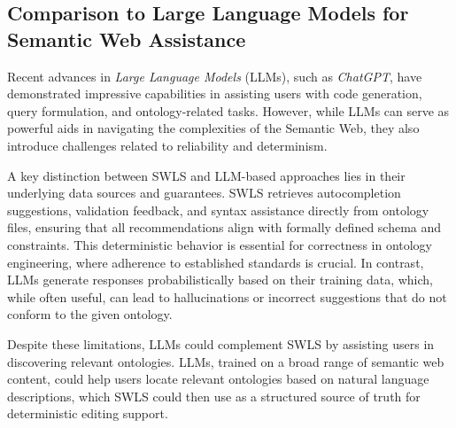 \subsection{Comparison to Large Language Models for Semantic Web Assistance}

Recent advances in \textit{Large Language Models} (LLMs), such as \textit{ChatGPT}, have demonstrated impressive capabilities in assisting users with code generation, query formulation, and ontology-related tasks\cite{Chad}. 
However, while LLMs can serve as powerful aids in navigating the complexities of the Semantic Web, they also introduce challenges related to reliability and determinism.  

A key distinction between SWLS and LLM-based approaches lies in their underlying data sources and guarantees.
SWLS retrieves autocompletion suggestions, validation feedback, and syntax assistance directly from ontology files, ensuring that all recommendations align with formally defined schema and constraints.
This deterministic behavior is essential for correctness in ontology engineering, where adherence to established standards is crucial. 
In contrast, LLMs generate responses probabilistically based on their training data, which, while often useful, can lead to hallucinations or incorrect suggestions that do not conform to the given ontology.

Despite these limitations, LLMs could complement SWLS by assisting users in discovering relevant ontologies.
LLMs, trained on a broad range of semantic web content, could help users locate relevant ontologies based on natural language descriptions, which SWLS could then use as a structured source of truth for deterministic editing support.  

